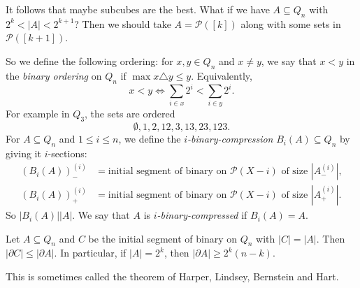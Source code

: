 \documentclass[12pt]{article}
\begin{document}
It follows that maybe subcubes are the best. What if we have $A \subseteq Q_n$ with $2^{k} < |A| < 2^{k+1}$? Then we should take $A = \mathcal{P}([k])$ along with some sets in $\mathcal{P}([k+1])$.

So we define the following ordering: for $x, y \in Q_n$ and $x \neq y$, we say that $x < y$ in the \emph{binary ordering} on $Q_n$ if $\max x \triangle y \leq y$. Equivalently,
\[
x < y \iff \sum_{i \in x} 2^{i} < \sum_{i \in y} 2^{i}.
\]
For example in $Q_3$, the sets are ordered
\[
\emptyset, 1, 2, 12, 3, 13, 23, 123.
\]
For $A \subseteq Q_n$ and $1 \leq i \leq n$, we define the \emph{$i$-binary-compression} $B_i(A) \subseteq Q_n$ by giving it $i$-sections:
\begin{align*}
(B_i(A))^{(i)}_- &= \text{initial segment of binary on } \mathcal{P}(X - i) \text{ of size } |A_-^{(i)}|, \\
(B_i(A))^{(i)}_+ &= \text{initial segment of binary on } \mathcal{P}(X - i) \text{ of size } |A_+^{(i)}|.
\end{align*}
So $|B_i(A)| |A|$. We say that $A$ is \emph{$i$-binary-compressed} if $B_i(A) = A$.

\begin{theorem}
	Let $A \subseteq Q_n$ and $C$ be the initial segment of binary on $Q_n$ with $|C| = |A|$. Then $|\partial C| \leq |\partial A|$. In particular, if $|A| = 2^{k}$, then $|\partial A| \geq 2^{k}(n-k)$.
\end{theorem}

\begin{remark}
	This is sometimes called the theorem of Harper, Lindsey, Bernstein and Hart.
\end{remark}
\end{document}
